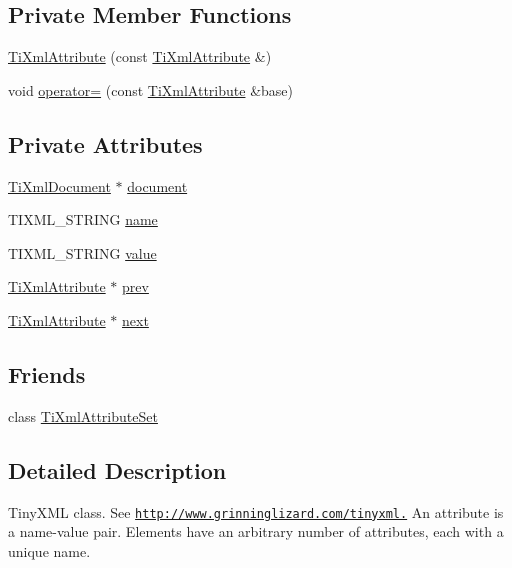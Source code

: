 \subsection*{Private Member Functions}
\begin{DoxyCompactItemize}
\item 
\hyperlink{class_ti_xml_attribute_aee53e434ace7271afc5ce51aeea0b400}{TiXmlAttribute} (const \hyperlink{class_ti_xml_attribute}{TiXmlAttribute} \&)
\item 
void \hyperlink{class_ti_xml_attribute_a83b9c2a47dbfadf5029f2c0f13c18466}{operator=} (const \hyperlink{class_ti_xml_attribute}{TiXmlAttribute} \&base)
\end{DoxyCompactItemize}
\subsection*{Private Attributes}
\begin{DoxyCompactItemize}
\item 
\hyperlink{class_ti_xml_document}{TiXmlDocument} $\ast$ \hyperlink{class_ti_xml_attribute_ada41d3cff50cd33a78072806f88d4433}{document}
\item 
TIXML\_\-STRING \hyperlink{class_ti_xml_attribute_afcbe165f33f08cf9b24daa33f0ee951a}{name}
\item 
TIXML\_\-STRING \hyperlink{class_ti_xml_attribute_ae9e4e5f442347434b1da43954cc1b411}{value}
\item 
\hyperlink{class_ti_xml_attribute}{TiXmlAttribute} $\ast$ \hyperlink{class_ti_xml_attribute_aaf6c6272c625fbf38e571cbf570ea94a}{prev}
\item 
\hyperlink{class_ti_xml_attribute}{TiXmlAttribute} $\ast$ \hyperlink{class_ti_xml_attribute_ae851adf61b80cf45b797fee77dea135f}{next}
\end{DoxyCompactItemize}
\subsection*{Friends}
\begin{DoxyCompactItemize}
\item 
class \hyperlink{class_ti_xml_attribute_a35a7b7f89f708527677d5078d41ce0bf}{TiXmlAttributeSet}
\end{DoxyCompactItemize}


\subsection{Detailed Description}
TinyXML class. See \href{http://www.grinninglizard.com/tinyxml.}{\tt http://www.grinninglizard.com/tinyxml.} An attribute is a name-\/value pair. Elements have an arbitrary number of attributes, each with a unique name.

